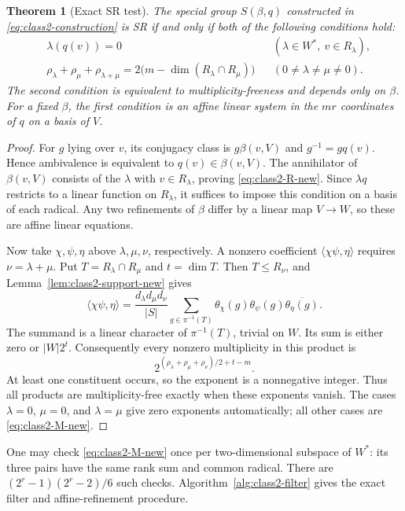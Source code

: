 \documentclass[11pt,a4paper]{amsart}
\newtheorem{thm}{Theorem}[section]
\theoremstyle{definition}
\theoremstyle{remark}
\numberwithin{equation}{section}
\begin{document}
\begin{thm}[Exact SR test]\label{thm:class2-SR-new}
The special group $S(\beta,q)$ constructed in
\eqref{eq:class2-construction} is SR if and only if both
of the following conditions hold:
\begin{align}
 &\lambda(q(v))=0
   &&(\lambda\in W^*,\ v\in R_\lambda),\label{eq:class2-R-new}\\
 &\rho_\lambda+\rho_\mu+\rho_{\lambda+\mu}
   =2\bigl(m-\dim(R_\lambda\cap R_\mu)\bigr)
   &&(0\ne\lambda\ne\mu\ne0).\label{eq:class2-M-new}
\end{align}
The second condition is equivalent to multiplicity-freeness and depends
only on $\beta$. For a fixed $\beta$, the first condition is an affine
linear system in the $mr$ coordinates of $q$ on a basis of $V$.
\end{thm}
\begin{proof}
For $g$ lying over $v$, its conjugacy class is
$g\beta(v,V)$ and $g^{-1}=gq(v)$. Hence ambivalence is equivalent to
$q(v)\in\beta(v,V)$. The annihilator of $\beta(v,V)$ consists of the
$\lambda$ with $v\in R_\lambda$, proving
\eqref{eq:class2-R-new}. Since $\lambda q$ restricts to a linear
function on $R_\lambda$, it suffices to impose this condition on a
basis of each radical. Any two refinements of $\beta$ differ by a
linear map $V\to W$, so these are affine linear equations.

Now take $\chi,\psi,\eta$ above $\lambda,\mu,\nu$, respectively.
A nonzero coefficient $\langle\chi\psi,\eta\rangle$ requires
$\nu=\lambda+\mu$. Put
$T=R_\lambda\cap R_\mu$ and $t=\dim T$. Then
$T\le R_\nu$, and Lemma~\ref{lem:class2-support-new} gives
\[
 \langle\chi\psi,\eta\rangle
 =\frac{d_\lambda d_\mu d_\nu}{|S|}
  \sum_{g\in\pi^{-1}(T)}
  \theta_\chi(g)\theta_\psi(g)\overline{\theta_\eta(g)}.
\]
The summand is a linear character of $\pi^{-1}(T)$, trivial on $W$.
Its sum is either zero or $|W|2^t$. Consequently every nonzero
multiplicity in this product is
\begin{equation}\label{eq:class2-multiplicity-new}
 2^{(\rho_\lambda+\rho_\mu+\rho_\nu)/2+t-m}.
\end{equation}
At least one constituent occurs, so the exponent is a nonnegative
integer. Thus all products are multiplicity-free exactly when these
exponents vanish. The cases $\lambda=0$, $\mu=0$, and
$\lambda=\mu$ give zero exponents automatically; all other cases
are \eqref{eq:class2-M-new}.
\end{proof}

One may check \eqref{eq:class2-M-new} once per two-dimensional subspace
of $W^*$: its three pairs have the same rank sum and common radical.
There are $(2^r-1)(2^r-2)/6$ such checks.
Algorithm~\ref{alg:class2-filter} gives the exact filter and affine-refinement procedure.
\end{document}
